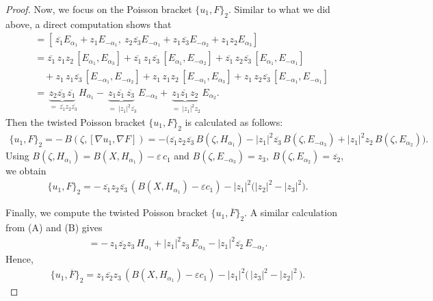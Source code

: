 \documentclass[11pt]{amsart}
\theoremstyle{definition}
\theoremstyle{plain}
\theoremstyle{conclusion}
\begin{document}
\begin{proof}
 Now, we focus on the Poisson bracket $\{u_1,F\}_2$. Similar to what we did above, a direct computation shows that \begin{align*}
[\nabla u_1,\nabla F] &= \left[\,\overline{z_1}E_{\alpha_1}+z_1E_{-\alpha_1},\ z_2\overline{z_3}E_{-\alpha_1}+z_1\overline{z_3}E_{-\alpha_2}+z_1z_2E_{\alpha_3}\right]\\
&= \overline{z_1}\,z_1z_2\,[E_{\alpha_1},E_{\alpha_3}]+\overline{z_1}\,z_1\overline{z_3}\,[E_{\alpha_1},E_{-\alpha_2}] + \overline{z_1}\,z_2\overline{z_3}\,[E_{\alpha_1},E_{-\alpha_1}]\\
&\quad +  z_1\,z_1\overline{z_3}\,[E_{-\alpha_1},E_{-\alpha_2}] +  z_1\,z_1z_2\,[E_{-\alpha_1},E_{\alpha_3}] +  z_1\,z_2\overline{z_3}\,[E_{-\alpha_1},E_{-\alpha_1}]\\
&=  \underbrace{z_2\overline{z_3}\,\overline{z_1}}_{\;=\ \overline{z_1}z_2\overline{z_3}}\,H_{\alpha_1} - \underbrace{z_1\overline{z_1}\,\overline{z_3}}_{\;=\ |z_1|^2\overline{z_3}}\,E_{-\alpha_3} + \underbrace{z_1\overline{z_1}\,z_2}_{\;=\ |z_1|^2 z_2}\,E_{\alpha_2}.
\end{align*}
Then the twisted Poisson bracket $\{u_1,F\}_2$ is calculated as follows: \begin{align*}
\{u_1,F\}_2 =-\,B(\zeta,[\nabla u_1,\nabla F]) = -\Big(\overline{z_1}z_2\overline{z_3}\,B(\zeta,H_{\alpha_1}) - |z_1|^2\overline{z_3}\,B(\zeta,E_{-\alpha_3}) +  |z_1|^2 z_2\,B(\zeta,E_{\alpha_2})\Big).
\end{align*} Using $B(\zeta,H_{\alpha_1})=B(X,H_{\alpha_1})-\varepsilon\,c_1$ and $B(\zeta,E_{-\alpha_3})=z_3,\ B(\zeta,E_{\alpha_2})=\overline{z_2}$, we obtain \begin{align}
\{u_1,F\}_2 = -\,\overline{z_1}z_2\overline{z_3}\, \left(B(X,H_{\alpha_1})-\varepsilon c_1 \right) -|z_1|^2\big( |z_2|^2-|z_3|^2 \big). \label{eq:a1}
\end{align}

 Finally, we compute the twisted Poisson bracket $\{u_1,\overline{F}\}_2$. A similar calculation from (A) and (B) gives \begin{align*}
[\nabla u_1,\nabla \overline{F}] = -\,z_1\overline{z_2}z_3\,H_{\alpha_1}+|z_1|^2 z_3\,E_{\alpha_3}-|z_1|^2\overline{z_2}\,E_{-\alpha_2}.
\end{align*} Hence, \begin{align}
\{u_1,\overline{F}\}_2 = z_1\overline{z_2}z_3\,\left(B(X,H_{\alpha_1})-\varepsilon c_1\right) -|z_1|^2\big(\,|z_3|^2-|z_2|^2\,\big). \label{eq:a2}
\end{align}


\end{proof}
\end{document}
